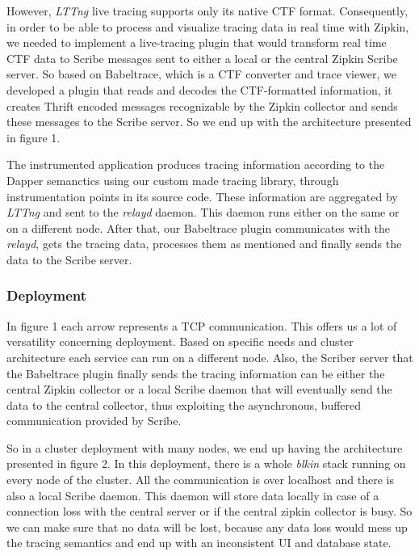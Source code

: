\documentclass[a4paper,10pt,twocolumn]{article}
\begin{document}
However, \emph{LTTng} live tracing supports only its native CTF format. 
Consequently, in order to be able to process and visualize tracing data in real
time with Zipkin, we needed to implement a live-tracing plugin that would 
transform real time CTF data to Scribe messages sent to either a local or the
central Zipkin Scribe server. So based on Babeltrace\cite{bltrace}, which is a 
CTF converter and trace viewer, we developed a plugin that reads and decodes the
CTF-formatted information, it creates Thrift\cite{thrift} encoded messages 
recognizable by the Zipkin collector and sends these messages to the Scribe 
server. So we end up with the architecture presented in figure 1.

The instrumented application produces tracing information according to the 
Dapper semanctics using our custom made tracing library, through instrumentation
points in its source code. These information are aggregated by \emph{LTTng} and
sent to the \emph{relayd} daemon. This daemon runs either on the same or on a 
different node. After that, our Babeltrace plugin communicates with the 
\emph{relayd}, gets the tracing data, processes them as mentioned and finally 
sends the data to the Scribe server. 

\subsubsection{Deployment}
In figure 1 each arrow represents a TCP communication. This offers us a lot of 
versatility concerning deployment. Based on specific needs and cluster 
architecture each service can run on a different node.  Also, the Scriber server
that the Babeltrace plugin finally sends the tracing information can be either 
the central Zipkin collector or a local Scribe daemon that will eventually send
the data to the central collector, thus exploiting the 
asynchronous, buffered communication provided by Scribe.

So in a cluster deployment with many nodes, we end up having the architecture
presented in figure 2. In this deployment, there is a whole \emph{blkin} stack 
running on every node of the cluster. All the communication is over localhost 
and there is also a local Scribe daemon. This daemon will store data locally in
case of a connection loss with the central server or if the central zipkin 
collector is busy. So we can make sure that no data will be lost, because any
data loss would mess up the tracing semantics and end up with an inconsistent UI
and database state.
\end{document}
